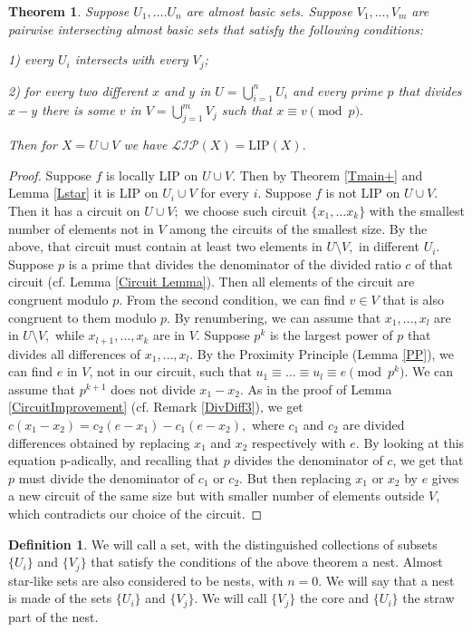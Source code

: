 \documentclass[10pt]{article}
\newtheorem{theorem}{Theorem}
\theoremstyle{definition}
\newtheorem{definition}{Definition}
\begin{document}
\begin{theorem} \label{Nest} Suppose $U_1,\dots. U_n$ are almost basic sets. Suppose $V_1,\dots, V_m $ are pairwise intersecting almost basic sets that satisfy the following conditions:

1) every $U_i$ intersects with every $V_j$;

2) for every two different $x$ and $y$ in $U=\bigcup \limits_{i=1}^n U_i$ and every prime $p$ that divides $x-y$ there is some $v$ in $V=\bigcup \limits_{j=1}^m V_j$ such that $x\equiv v \pmod p.$

Then for $X=U\cup V$ we have $\mathcal{LIP}(X)=\textrm{LIP}(X).$

\end{theorem}
\begin{proof} Suppose $f$ is locally LIP on $U\cup V.$ Then by Theorem \ref{Tmain+} and Lemma \ref{Lstar} it is LIP on $U_i\cup V$ for every $i.$  Suppose $f$ is not LIP on $U\cup V.$ Then it has a circuit on $U\cup V;$ we choose such circuit $\{x_1,\dots x_k\}$ with the smallest number of elements not in $V$ among the circuits of the smallest size.  By the above,  that circuit must contain at least two elements in $U\setminus V,$ in different $U_i$. Suppose $p$ is a prime that divides the denominator of the divided ratio $c$ of that circuit (cf. Lemma \ref{Circuit Lemma}). Then all elements of the circuit are congruent modulo $p$. From the second condition, we can find $v\in V$ that is also congruent to them modulo $p$. By renumbering, we can assume that $x_1,\dots, x_l$ are in $U\setminus V,$ while $x_{l+1},\dots, x_k$ are in $V.$ Suppose $p^k$ is the largest power of $p$ that divides all differences of $x_1,\dots, x_l$. By the Proximity Principle (Lemma \ref{PP}), we can find $e$ in $V$,  not in our circuit, such that $u_1 \equiv \ldots \equiv u_l \equiv e \pmod {p^k}.$ We can assume that $p^{k+1}$ does not divide $x_1-x_2.$ As in the proof of Lemma \ref{CircuitImprovement} (cf. Remark \ref{DivDiff3}), we get $c(x_1-x_2)=c_2(e-x_1)-c_1(e-x_2),$ where $c_1$ and $c_2$ are divided differences obtained by replacing $x_1$ and $x_2$ respectively with $e$. By looking at this equation p-adically, and recalling that $p$ divides the denominator of $c$, we get that $p$ must divide the denominator of $c_1$ or $c_2.$ But then replacing $x_1$ or $x_2$ by $e$ gives a new circuit of the same size but with smaller number of elements outside $V$, which contradicts our choice of the circuit.
\end{proof}

\begin{definition} \label{Nest} We will call a set, with the distinguished collections of subsets $\{U_i\}$ and $\{V_j\}$ that satisfy the conditions of the above theorem a nest. Almost star-like sets are also considered to be nests, with $n=0$. We will say that a nest is made of the sets $\{U_i\}$ and $\{V_j\}$. We will call $\{V_j\}$ the core and $\{U_i\}$ the straw part of the nest.
\end{definition}
\end{document}
